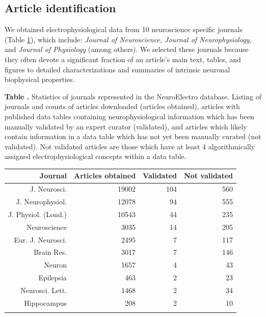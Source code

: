 \documentclass{template/frontiersSCNS} %
\begin{document}
\subsection{Article identification}
We obtained electrophysiological data from 10 neuroscience specific journals (Table \ref{tab:journal_listing}), which include: \emph{Journal of Neuroscience, Journal of Neurophysiology,} and \emph{Journal of Physiology} (among others). 
We selected these journals because they often devote a significant fraction of an article's main text, tables, and figures to detailed characterizations and summaries of intrinsic neuronal biophysical properties. 

\begin{table}[!t]
\textbf{\label{tab:journal_listing} Table .}
{Statistics of journals represented in the NeuroElectro database. Listing of journals and counts of articles downloaded (articles obtained), articles with published data tables containing neurophysiological information which has been manually validated by an expert curator (validated), and articles which likely contain information in a data table which has not yet been manually curated (not validated). 
Not validated articles are those which have at least 4 algorithmically assigned electrophysiological concepts within a data table.}
\processtable{}
{\begin{tabular}{rrrr}
    \toprule
    Journal & Articles obtained & Validated & Not validated \\
    \midrule
    J. Neurosci. & 19002 & 104   & 560 \\
    J. Neurophysiol. & 12078 & 94    & 555 \\
    J. Physiol. (Lond.) & 10543 & 44    & 235 \\
    Neuroscience & 3035  & 14    & 205 \\
    Eur. J. Neurosci. & 2495  & 7     & 117 \\
    Brain Res. & 3017  & 7     & 146 \\
    Neuron & 1657  & 4     & 43 \\
    Epilepsia & 463   & 2     & 23 \\
    Neurosci. Lett. & 1468  & 2     & 34 \\
    Hippocampus & 208   & 2     & 10 \\
    \botrule
    \end{tabular}}
   {}
\end{table}
\end{document}

